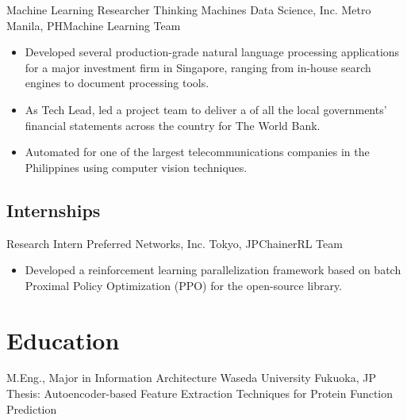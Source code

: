 \documentclass[12pt,a4paper]{moderncv}
\begin{document}
{Machine Learning Researcher}
{Thinking Machines Data Science, Inc.}
{Metro Manila, PH}{Machine Learning Team}
{
    \begin{itemize}
        \item Developed several production-grade natural language processing
              applications for a major investment firm in Singapore, ranging from
              in-house search engines to document processing tools.
        \item As Tech Lead, led a project team to deliver a {\color{blue}
                      } of
              all the local governments' financial statements across the country for
              The World Bank.
        \item Automated {\color{blue}}
              for one of the largest telecommunications companies in the Philippines
              using computer vision techniques.
    \end{itemize}
}
\vspace{0.5em}

\subsection{Internships}
{Research Intern}
{Preferred Networks, Inc.}
{Tokyo, JP}{ChainerRL Team}
{
    \begin{itemize}
        \item Developed a reinforcement learning parallelization framework
              based on batch Proximal Policy Optimization (PPO) for the
              open-source
              {\color{blue}}
              library.
    \end{itemize}
}
\vspace{0.5em}

\section{Education}
{M.Eng., Major in Information Architecture}
{Waseda University}
{Fukuoka, JP}{}
{Thesis: Autoencoder-based Feature Extraction Techniques for Protein
    Function Prediction}
\vspace{0.5em}
\end{document}
